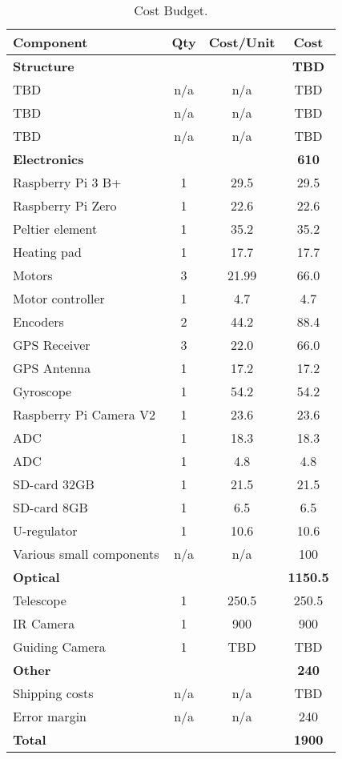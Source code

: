 \begin{table}[H]
\centering
\begin{tabular}{|l|c|c|c|} 
\hline
Component & Qty & Cost/Unit & Cost   \\ 
\hline
\rowcolor[HTML]{9B9B9B}
\textbf{Structure} &  &  & \textbf{TBD}  \\
TBD & n/a & n/a & TBD  \\
TBD & n/a & n/a & TBD  \\
TBD & n/a & n/a & TBD  \\
\rowcolor[HTML]{9B9B9B}
\textbf{Electronics} &  &  & \textbf{610}  \\ 
Raspberry Pi 3 B+ & 1 & 29.5 & 29.5  \\
Raspberry Pi Zero & 1 & 22.6 & 22.6  \\
Peltier element & 1 & 35.2 & 35.2  \\
Heating pad & 1 & 17.7 & 17.7  \\ 
Motors & 3 & 21.99 & 66.0  \\ 
Motor controller & 1 & 4.7 & 4.7  \\
Encoders & 2 & 44.2 & 88.4  \\
GPS Receiver & 3 & 22.0 & 66.0  \\ 
GPS Antenna & 1 & 17.2 & 17.2  \\
Gyroscope & 1 & 54.2 & 54.2  \\
Raspberry Pi Camera V2 & 1 & 23.6 & 23.6  \\ 
ADC & 1 & 18.3 & 18.3  \\ 
ADC & 1 & 4.8 & 4.8  \\
SD-card 32GB & 1 & 21.5 & 21.5  \\
SD-card 8GB & 1 & 6.5 & 6.5  \\
U-regulator & 1 & 10.6 & 10.6  \\
Various small components & n/a & n/a & 100  \\
\rowcolor[HTML]{9B9B9B}
\textbf{Optical} &  &  & \textbf{1150.5}  \\
Telescope & 1 & 250.5 & 250.5  \\
IR Camera & 1 & 900 & 900  \\
Guiding Camera & 1 & TBD & TBD  \\
\rowcolor[HTML]{9B9B9B}
\textbf{Other} &  &  & \textbf{240}  \\
Shipping costs & n/a & n/a & TBD  \\
Error margin & n/a & n/a & 240  \\
\hline
\textbf{Total} &  &  & \textbf{1900}  \\
\hline
\end{tabular}
\caption{Cost Budget.}
\label{table:mass-and-cost-budget}
\end{table}

\raggedbottom